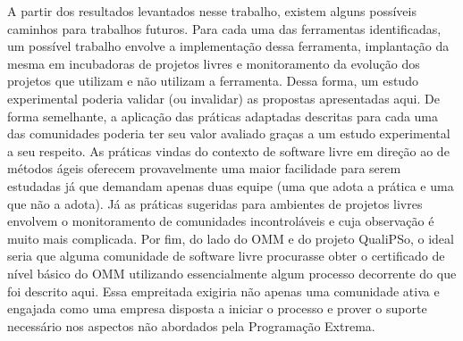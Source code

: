 A partir dos resultados levantados nesse trabalho, existem alguns
possíveis caminhos para trabalhos futuros. Para cada uma das
ferramentas identificadas, um possível trabalho envolve a
implementação dessa ferramenta, implantação da mesma em incubadoras de
projetos livres e monitoramento da evolução dos projetos que utilizam
e não utilizam a ferramenta. Dessa forma, um estudo experimental
poderia validar (ou invalidar) as propostas apresentadas aqui.  De
forma semelhante, a aplicação das práticas adaptadas descritas para
cada uma das comunidades poderia ter seu valor avaliado graças a um
estudo experimental a seu respeito. As práticas vindas do contexto de
software livre em direção ao de métodos ágeis oferecem provavelmente
uma maior facilidade para serem estudadas já que demandam apenas duas
equipe (uma que adota a prática e uma que não a adota). Já as práticas
sugeridas para ambientes de projetos livres envolvem o monitoramento
de comunidades incontroláveis e cuja observação é muito mais
complicada. Por fim, do lado do OMM e do projeto QualiPSo, o ideal
seria que alguma comunidade de software livre procurasse obter o
certificado de nível básico do OMM utilizando essencialmente algum
processo decorrente do que foi descrito aqui. Essa empreitada exigiria
não apenas uma comunidade ativa e engajada como uma empresa disposta a
iniciar o processo e prover o suporte necessário nos aspectos não
abordados pela Programação Extrema.
